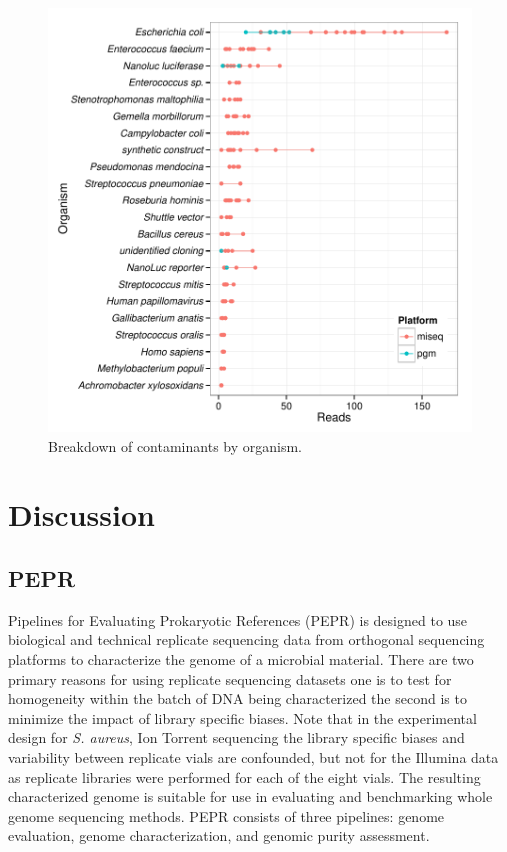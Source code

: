 \documentclass[smallextended]{svjour3}\usepackage[]{graphicx}\usepackage[]{color}
\makeatletter
\def\maxwidth{ %
  \ifdim\Gin@nat@width>\linewidth
    \linewidth
  \else
    \Gin@nat@width
  \fi
}
\newenvironment{knitrout}{}{} %
\makeatother
\begin{document}
\begin{knitrout}
\color{fgcolor}\begin{figure}

{\centering \includegraphics[width=\maxwidth]{figure/contamTaxaFig-1} 

}

\caption[Breakdown of contaminants by organism]{Breakdown of contaminants by organism.}\label{fig:contamTaxaFig}
\end{figure}


\end{knitrout}

\section{Discussion}
\subsection{PEPR}
Pipelines for Evaluating Prokaryotic References (PEPR) is designed to use biological and technical replicate sequencing data from orthogonal sequencing platforms to characterize the genome of a microbial material.  There are two primary reasons for using replicate sequencing datasets one is to test for homogeneity within the batch of DNA being characterized the second is to minimize the impact of library specific biases. Note that in the experimental design for \textit{S. aureus}, Ion Torrent sequencing the library specific biases and variability between replicate vials are confounded, but not for the Illumina data as replicate libraries were performed for each of the eight vials. The resulting characterized genome is suitable for use in evaluating and benchmarking whole genome sequencing methods. PEPR consists of three pipelines: genome evaluation, genome characterization, and genomic purity assessment.
\end{document}
